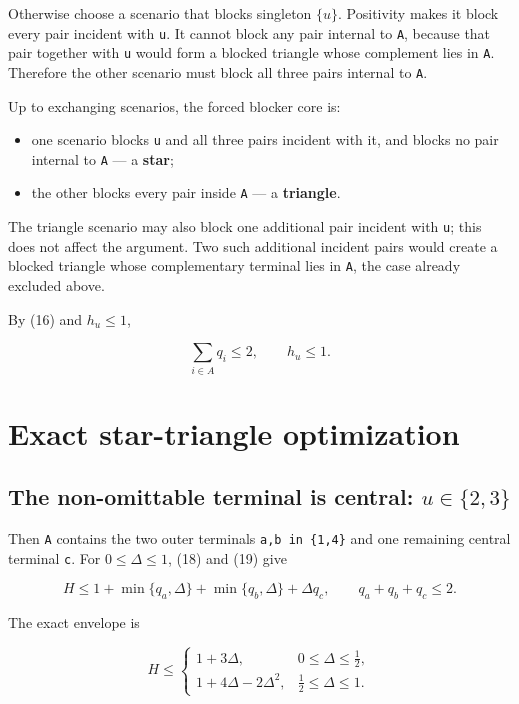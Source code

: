 \documentclass[
  11pt,
]{article}
\providecommand{\tightlist}{%
  \setlength{\itemsep}{0pt}\setlength{\parskip}{0pt}}
\begin{document}
Otherwise choose a scenario that blocks singleton \(\{u\}\). Positivity
makes it block every pair incident with \texttt{u}. It cannot block any
pair internal to \texttt{A}, because that pair together with \texttt{u}
would form a blocked triangle whose complement lies in \texttt{A}.
Therefore the other scenario must block all three pairs internal to
\texttt{A}.

Up to exchanging scenarios, the forced blocker core is:

\begin{itemize}
\tightlist
\item
  one scenario blocks \texttt{u} and all three pairs incident with it,
  and blocks no pair internal to \texttt{A} --- a \textbf{star};
\item
  the other blocks every pair inside \texttt{A} --- a \textbf{triangle}.
\end{itemize}

The triangle scenario may also block one additional pair incident with
\texttt{u}; this does not affect the argument. Two such additional
incident pairs would create a blocked triangle whose complementary
terminal lies in \texttt{A}, the case already excluded above.

By (16) and \(h_u\le1\),

\[
\sum_{i\in A}q_i\le2,
\qquad
h_u\le1.
\tag{19}
\]

\section{Exact star-triangle
optimization}\label{exact-star-triangle-optimization}

\subsection{\texorpdfstring{The non-omittable terminal is central:
\(u\in\{2,3\}\)}{The non-omittable terminal is central: u\textbackslash in\textbackslash\{2,3\textbackslash\}}}\label{the-non-omittable-terminal-is-central-uin23}

Then \texttt{A} contains the two outer terminals
\texttt{a,b\ in\ \{1,4\}} and one remaining central terminal \texttt{c}.
For \(0\le\Delta\le1\), (18) and (19) give

\[
H\le
1+\min\{q_a,\Delta\}
 +\min\{q_b,\Delta\}
 +\Delta q_c,
\qquad
q_a+q_b+q_c\le2.
\tag{20}
\]

The exact envelope is

\[
H\le
\begin{cases}
1+3\Delta,&0\le\Delta\le\tfrac12,\\[1mm]
1+4\Delta-2\Delta^2,&\tfrac12\le\Delta\le1.
\end{cases}
\tag{21}
\]
\end{document}
